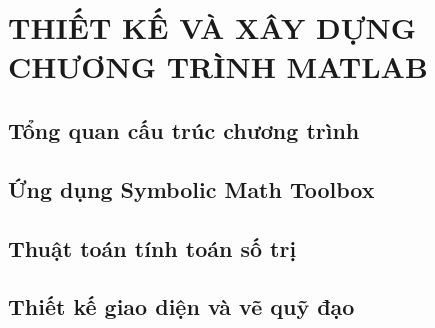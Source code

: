 \chapter{THIẾT KẾ VÀ XÂY DỰNG CHƯƠNG TRÌNH MATLAB}
\section{Tổng quan cấu trúc chương trình}

\section{Ứng dụng Symbolic Math Toolbox}

\section{Thuật toán tính toán số trị}

\section{Thiết kế giao diện và vẽ quỹ đạo}

